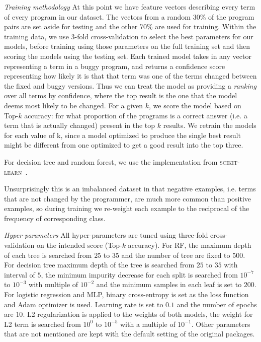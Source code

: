 \documentclass[conference]{IEEEtran}
\begin{document}
\emph{Training methodology}
At this point we have feature vectors describing every term of every program in
our dataset. The vectors from a random 30\% of the program pairs are set aside for testing and
the other 70\% are used for training.
Within the training data, we use 3-fold
cross-validation to select the best parameters for our models, before training
using those parameters on the full training set and then scoring the models
using the testing set.
Each trained model takes in any vector representing a term
in a buggy program, and returns a confidence score representing how likely it is that
that term was one of the terms changed between the fixed and buggy versions.
Thus we can treat the model as providing a \emph{ranking} over all terms by
confidence, where the top result is the one that the model deems most likely
to be changed.
For a given $k$, we score the model based on Top-$k$ accuracy: for what
proportion of the programs is a correct answer (i.e. a term that is actually
changed) present in the top $k$ results.
We retrain the models for each value of k, since a model optimized to produce
the single best result might be different from one optimized to get a good
result into the top three.

For decision tree and random forest, we use the implementation from
\textsc{scikit-learn}~\cite{scikit-learn}.

Unsurprisingly this is an imbalanced dataset in that negative examples, i.e.
terms that are not changed by the programmer, are much more common than
positive examples, so during training we re-weight each example to the reciprocal
of the frequency of corresponding class.

\emph{Hyper-parameters}
All hyper-parameters are tuned using three-fold cross-validation on the
intended score (Top-$k$ accuracy).
For RF, the maximum depth of each tree is searched from $25$ to $35$ and the
number of tree are fixed to $500$.
For decision tree maximum depth of the tree is searched from $25$ to $35$ with interval of $5$,
the minimum impurity decrease for each split is searched from $10^{-7}$ to
$10^{-3}$ with multiple of $10^{-2}$ and the minimum samples in each leaf is set to $200$.
For logistic regression and MLP, binary cross-entropy is set as the loss
function and Adam \cite{kingma2014adam} optimizer is used.
Learning rate is set to $0.1$ and the number of epochs are $10$.
L2 regularization is applied to the weights of both models,
the weight for L2 term is searched from $10^0$ to $10^{-5}$ with a multiple of $10^{-1}$.
Other parameters that are not mentioned are kept with the default setting of the
original packages.
\end{document}
